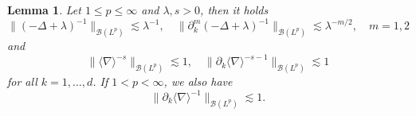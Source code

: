 \documentclass[12pt]{article}
\theoremstyle{plain}
\newtheorem{lemma}[theo]{Lemma}
\begin{document}
	
	\begin{lemma}
	\label{lemma: resolvent Lp}
	    Let $1\leq p\leq \infty$ and $\lambda,s >0$, then it holds 
	    \begin{equation}\label{eq:bound-resolv_Lp}
	        \|(-\Delta + \lambda )^{-1} \|_{\mathcal{B}(L^p)} \lesssim \lambda^{-1}, \quad  \|\partial_k^m(-\Delta + \lambda )^{-1} \|_{\mathcal{B}(L^p)} \lesssim \lambda^{-m/2}, \quad m =1,2 
	    \end{equation}
	    and 
	    \begin{equation}\label{eq:bound-bessel_Lp}
	        \|\langle \nabla \rangle^{-s}\|_{\mathcal{B}(L^p)} \lesssim 1 , \quad \|\partial_k \langle \nabla \rangle^{-s-1}\|_{\mathcal{B}(L^p)} \lesssim 1
	    \end{equation}
	    for all $k =1,\dots,d$. If $1<p<\infty$, we also have
	    \begin{equation}\label{eq:bound-bessel2_Lp}
	        \|\partial_k \langle \nabla \rangle^{-1}\|_{\mathcal{B}(L^p)} \lesssim 1.
	    \end{equation}
	\end{lemma}
	
\end{document}
